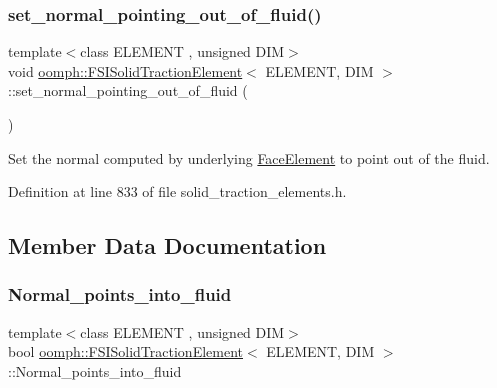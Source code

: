 \subsubsection{\texorpdfstring{set\+\_\+normal\+\_\+pointing\+\_\+out\+\_\+of\+\_\+fluid()}{set\_normal\_pointing\_out\_of\_fluid()}}
{\footnotesize\ttfamily template$<$class E\+L\+E\+M\+E\+NT , unsigned D\+IM$>$ \\
void \hyperlink{classoomph_1_1FSISolidTractionElement}{oomph\+::\+F\+S\+I\+Solid\+Traction\+Element}$<$ E\+L\+E\+M\+E\+NT, D\+IM $>$\+::set\+\_\+normal\+\_\+pointing\+\_\+out\+\_\+of\+\_\+fluid (\begin{DoxyParamCaption}{ }\end{DoxyParamCaption})\hspace{0.3cm}{\ttfamily [inline]}}



Set the normal computed by underlying \hyperlink{classoomph_1_1FaceElement}{Face\+Element} to point out of the fluid. 



Definition at line 833 of file solid\+\_\+traction\+\_\+elements.\+h.



\subsection{Member Data Documentation}
\mbox{\label{classoomph_1_1FSISolidTractionElement_ab00f0ee9793a838bac6d2343e42bfa7c}} 
\subsubsection{\texorpdfstring{Normal\+\_\+points\+\_\+into\+\_\+fluid}{Normal\_points\_into\_fluid}}
{\footnotesize\ttfamily template$<$class E\+L\+E\+M\+E\+NT , unsigned D\+IM$>$ \\
bool \hyperlink{classoomph_1_1FSISolidTractionElement}{oomph\+::\+F\+S\+I\+Solid\+Traction\+Element}$<$ E\+L\+E\+M\+E\+NT, D\+IM $>$\+::Normal\+\_\+points\+\_\+into\+\_\+fluid\hspace{0.3cm}{\ttfamily [private]}}



